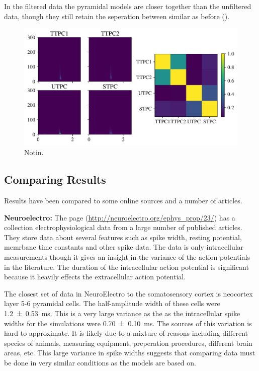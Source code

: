 \documentclass[altfont, fleqn]{uiophd}
\renewcommand{\cref}[1]{{\color{viridis_03}\mycref{#1}}}
\begin{document}
In the filtered data the pyramidal models are closer together than 
the unfiltered data, 
though they still retain the seperation between similar as before
(\cref{fig:4_pyr_overlap_filt}).

\begin{figure}[h]
    \begin{center}
        \includegraphics[width=\linewidth]{images/sec_4/pyr_overlap_filt.pdf}
        \caption{Notin.}
        \label{fig:4_pyr_overlap_filt}
    \end{center}
\end{figure}

\newpage
\subsection{Comparing Results}
Results have been compared to some online sources and a number of articles. 

\noindent
{\bf Neuroelectro:}
The page 
\textcite{_neuroelectro_????}
(\url{http://neuroelectro.org/ephys_prop/23/})
has a collection electrophysiological data 
from a large number of published articles.  
They store data about several features such as spike width, resting potential, 
memrbane time constants 
and other spike data. 
The data is only intracellular measurements
though it gives an insight in the variance of the 
action potentials in the literature. 
The duration of the intracellular action potential is significant 
because it 
heavily effects the extracellular action potential. %

The closest set of data in NeuroElectro 
to the somatosensory cortex is 
neocortex layer 5-6 pyramidal cells. 
The half-amplitude width of these cells were
\SI[separate-uncertainty = true]{1.2 \pm 0.53}{\milli\second}.
This is a very large variance as the 
as the intracellular spike widths for the simulations 
were
\SI[separate-uncertainty = true]{0.70 \pm 0.10}{\milli\second}.
The sources of this variation is hard to approximate. 
It is likely due to a mixture of reasons including
different species of animals, measuring equipment, 
preperation procedures, different brain areas, etc. 
This large variance in spike widths suggests that
comparing data must be done in very similar conditions
as the models are based on. 
\newline
\end{document}
